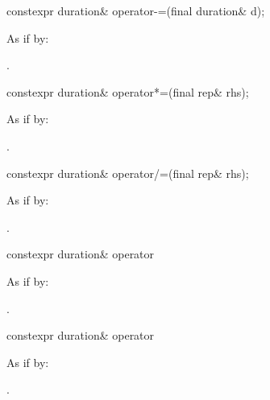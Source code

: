%
\begin{itemdecl}
constexpr duration& operator-=(final duration& d);
\end{itemdecl}

\begin{itemdescr}
\pnum
\effects As if by: 

\pnum
\returns {}.
\end{itemdescr}

%
\begin{itemdecl}
constexpr duration& operator*=(final rep& rhs);
\end{itemdecl}

\begin{itemdescr}
\pnum
\effects As if by: 

\pnum
\returns {}.
\end{itemdescr}

%
\begin{itemdecl}
constexpr duration& operator/=(final rep& rhs);
\end{itemdecl}

\begin{itemdescr}
\pnum
\effects As if by: 

\pnum
\returns {}.
\end{itemdescr}

%
\begin{itemdecl}
constexpr duration& operator%
\end{itemdecl}

\begin{itemdescr}
\pnum
\effects As if by: 

\pnum
\returns {}.
\end{itemdescr}

%
\begin{itemdecl}
constexpr duration& operator%
\end{itemdecl}

\begin{itemdescr}
\pnum
\effects As if by: 

\pnum
\returns {}.
\end{itemdescr}


